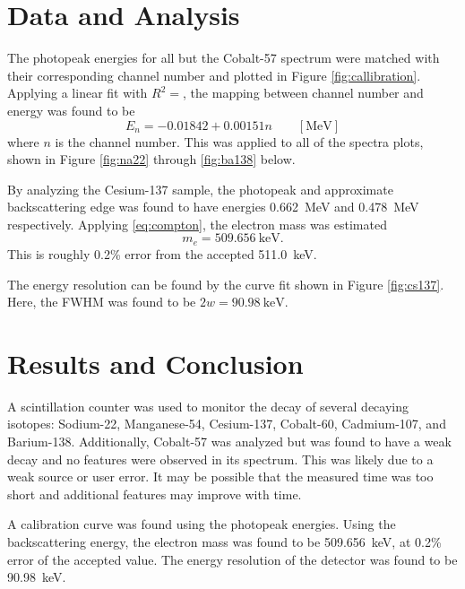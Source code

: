 \documentclass[notitlepage]{report}
\begin{document}
	\section{Data and Analysis}
	The photopeak energies for all but the Cobalt-57 spectrum were matched with their corresponding channel number and plotted in Figure \ref{fig:callibration}. Applying a linear fit with $R^2=$, the mapping between channel number and energy was found to be \begin{equation}
		E_n = -0.01842 + 0.00151 n \qquad [\si{\MeV}]
	\end{equation}
	where $n$ is the channel number. This was applied to all of the spectra plots, shown in Figure \ref{fig:na22} through \ref{fig:ba138} below. 
	
	By analyzing the Cesium-137 sample, the photopeak and approximate backscattering edge was found to have energies \SI{0.662}{\MeV} and \SI{0.478}{\MeV} respectively. Applying \eqref{eq:compton}, the electron mass was estimated $$m_e = \SI{509.656}{\keV}.$$ This is roughly 0.2\% error from the accepted \SI{511.0}{\keV}.
	
	The energy resolution can be found by the curve fit shown in Figure \ref{fig:cs137}. Here, the FWHM was found to be $2w = \SI{90.98}{\keV}$.
		
	
	\section{Results and Conclusion}
	 A scintillation counter was used to monitor the decay of several decaying isotopes: Sodium-22, Manganese-54, Cesium-137, Cobalt-60, Cadmium-107, and Barium-138. Additionally, Cobalt-57 was analyzed but was found to have a weak decay and no features were observed in its spectrum. This was likely due to a weak source or user error. It may be possible that the measured time was too short and additional features may improve with time.
	 
	 A calibration curve was found using the photopeak energies. Using the backscattering energy, the electron mass was found to be \SI{509.656}{\keV}, at 0.2\% error of the accepted value. The energy resolution of the detector was found to be \SI{90.98}{\keV}.
		
\end{document}
